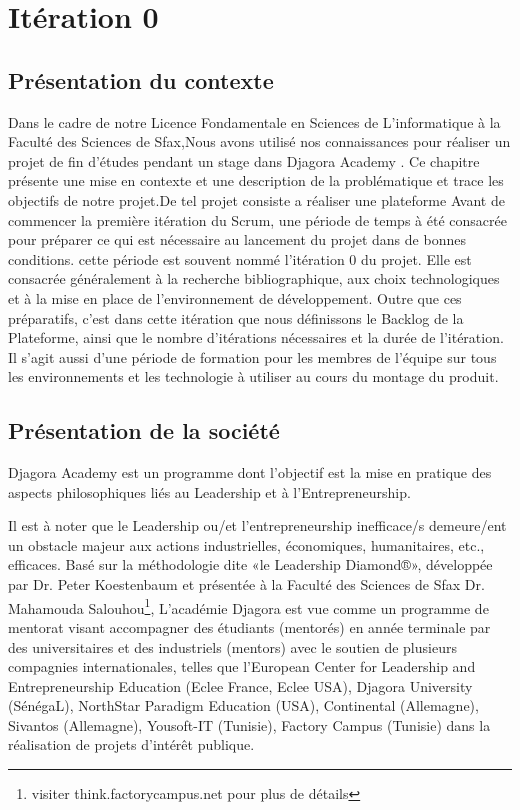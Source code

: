 \section{Itération 0}
\subsection{Présentation du contexte}
Dans le cadre de notre Licence Fondamentale en Sciences de L'informatique à 
la Faculté des Sciences de Sfax,Nous avons utilisé nos connaissances pour 
réaliser un projet de fin d'études pendant un stage dans Djagora Academy .
Ce chapitre présente une mise en contexte et une description de la problématique
et trace les objectifs de notre projet.De tel projet consiste a réaliser une
plateforme
Avant de commencer la première itération du Scrum, une période de temps à été
consacrée pour préparer ce qui est nécessaire au lancement du projet dans de bonnes
conditions. cette période est souvent nommé l’itération 0 du projet. Elle est consacrée
généralement à la recherche bibliographique, aux choix technologiques et à la mise en
place de l’environnement de développement. Outre que ces préparatifs, c’est dans cette
itération que nous définissons le Backlog de la Plateforme, ainsi que le nombre
d’itérations nécessaires et la durée de l’itération. Il s’agit aussi d’une période de
formation pour les membres de l’équipe sur tous les environnements et les technologie à
utiliser au cours du montage du produit.



\subsection{Présentation de la société}
Djagora Academy est un programme dont l'objectif est la mise en pratique des
aspects philosophiques liés au Leadership et à l'Entrepreneurship.

Il est à noter que le Leadership ou/et l'entrepreneurship inefficace/s
demeure/ent un obstacle majeur aux actions industrielles, économiques,
humanitaires, etc., efficaces.
Basé sur la méthodologie dite «le Leadership Diamond®», développée par Dr. Peter
Koestenbaum et présentée à la Faculté des Sciences de Sfax Dr. Mahamouda
Salouhou\footnote{visiter think.factorycampus.net pour plus de détails},
L'académie Djagora est vue comme un programme de mentorat visant accompagner des
étudiants (mentorés) en année terminale par des universitaires et des
industriels (mentors) avec le soutien de plusieurs compagnies internationales,
telles que l'European Center for Leadership and Entrepreneurship Education
(Eclee France, Eclee USA), Djagora University (SénégaL), NorthStar Paradigm
Education (USA), Continental (Allemagne), Sivantos (Allemagne), Yousoft-IT
(Tunisie), Factory Campus (Tunisie) dans la réalisation de projets d’intérêt
publique.

